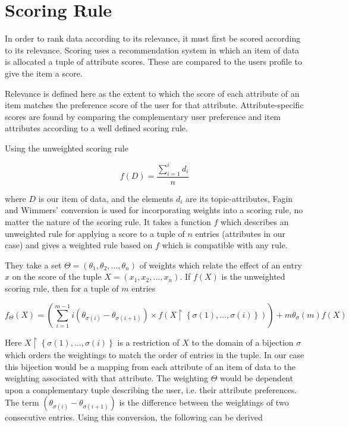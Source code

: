 \section{Scoring Rule}

In order to rank data according to its relevance, it must first be scored according to its relevance. Scoring uses a recommendation system in which an item of data is allocated a tuple of attribute scores. These are compared to the users profile to give the item a score.

Relevance is defined here as the extent to which the score of each attribute of an item matches the preference score of the user for that attribute. Attribute-specific scores are found by comparing the complementary user preference and item attributes according to a well defined scoring rule. 

Using the unweighted scoring rule

\begin{equation}\label{AverageUnweightedRule}	
	f(D) = \frac{\sum_{i=1}^{i} d_i}{n}
\end{equation}

where $D$ is our item of data, and the elements $d_i$ are its topic-attributes, Fagin and Wimmers' \cite{FaginWimmers1} conversion is used for incorporating weights into a scoring rule, no matter the nature of the scoring rule. It takes a function $f$ which describes an unweighted rule for applying a score to a tuple of $n$ entries (attributes in our case) and gives a weighted rule based on $f$ which is compatible with any rule. 

They take a set $\Theta = (\theta_1,\theta_2,\dotsc,\theta_n)$ of weights which relate the effect of an entry $x$ on the score of the tuple $ X = (x_1, x_2, \dots, x_n)$. If $f(X)$ is the unweighted scoring rule, then for a tuple of $m$ entries

\begin{equation}\label{WeightedRule}	
	f_\Theta (X) = \left(\sum_{i=1}^{m-1} i(\theta_{\sigma{(i)}} - \theta_{\sigma{(i+1)}})\times f(X\upharpoonright\left\{\sigma(1),\dots,\sigma(i)\right\})\right) + m  \theta_\sigma{(m)}  f(X)
\end{equation}

Here $X\restriction\left\{\sigma(1),\dots,\sigma(i)\right\}$ is a restriction of $X$ to the domain of a bijection $\sigma$ which orders the weightings to match the order of entries in the tuple. In our case this bijection would be a mapping from each attribute of an item of data to the weighting associated with that attribute. The weighting $\Theta$ would be dependent upon a complementary tuple describing the user, i.e. their attribute preferences. The term $(\theta_{\sigma{(i)}} - \theta_{\sigma{(i+1)}})$ is the difference between the weightings of two consecutive entries. 
Using this conversion, the following can be derived

